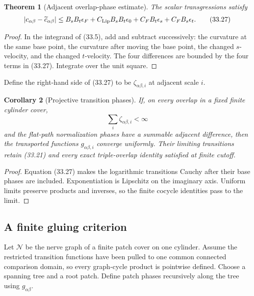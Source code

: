 \documentclass[11pt]{article}
\newtheorem{theorem}{Theorem}[section]
\newtheorem{corollary}[theorem]{Corollary}
\begin{document}
\begin{theorem}[Adjacent overlap-phase estimate]
\label{thm:v11v33-phase-estimate}
The scalar transgressions satisfy
\[
 |c_{\alpha\beta}-\widetilde c_{\alpha\beta}|
 \leq
 B_sB_t\epsilon_F
 +C_{\rm Lip}B_sB_t\epsilon_0
 +C_FB_t\epsilon_s
 +C_FB_s\epsilon_t.
 \tag{33.27}
\]
\end{theorem}

\begin{proof}
In the integrand of (33.5), add and subtract successively:
the curvature at the same base point, the curvature after moving the
base point, the changed \(s\)-velocity, and the changed \(t\)-velocity.
The four differences are bounded by the four terms in (33.27).
Integrate over the unit square.
\end{proof}

Define the right-hand side of (33.27) to be
\(\zeta_{\alpha\beta,i}\) at adjacent scale \(i\).

\begin{corollary}[Projective transition phases]
\label{cor:v11v33-projective-phases}
If, on every overlap in a fixed finite cylinder cover,
\[
 \sum_i\zeta_{\alpha\beta,i}<\infty
 \tag{33.28}
\]
and the flat-path normalization phases have a summable adjacent
difference, then the transported functions
\(g_{\alpha\beta,i}\) converge uniformly.  Their limiting transitions
retain (33.21) and every exact triple-overlap identity satisfied at
finite cutoff.
\end{corollary}

\begin{proof}
Equation (33.27) makes the logarithmic transitions Cauchy after their
base phases are included.  Exponentiation is Lipschitz on the imaginary
axis.  Uniform limits preserve products and inverses, so the finite
cocycle identities pass to the limit.
\end{proof}

\subsection{A finite gluing criterion}

Let \(\mathcal N\) be the nerve graph of a finite patch cover on one
cylinder.  Assume the restricted transition functions have been pulled to
one common connected comparison domain, so every graph-cycle product is
pointwise defined.  Choose a spanning tree and a root patch.  Define patch phases
recursively along the tree using \(g_{\alpha\beta}\).
\end{document}
